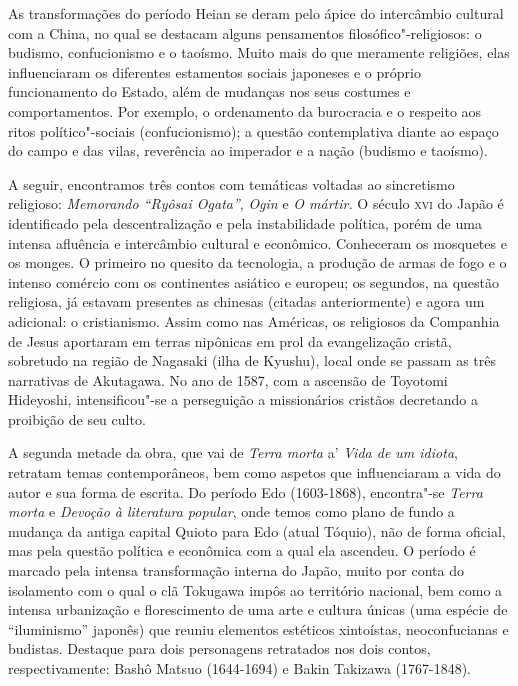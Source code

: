 \documentclass[12pt]{extarticle}
\begin{document}
As transformações do período Heian se deram pelo ápice do intercâmbio
cultural com a China, no qual se destacam alguns pensamentos
filosófico"-religiosos: o budismo, confucionismo e o taoísmo. Muito mais
do que meramente religiões, elas influenciaram os diferentes estamentos
sociais japoneses e o próprio funcionamento do Estado, além de mudanças
nos seus costumes e comportamentos. Por exemplo, o ordenamento da
burocracia e o respeito aos ritos político"-sociais (confucionismo); a
questão contemplativa diante ao espaço do campo e das vilas, reverência
ao imperador e a nação (budismo e taoísmo).

A seguir, encontramos três contos com temáticas voltadas ao sincretismo
religioso: \emph{Memorando ``Ryôsai Ogata''}, \emph{Ogin} e \emph{O
mártir.} O século \textsc{xvi} do Japão é identificado pela descentralização e
pela instabilidade política, porém de uma intensa afluência e
intercâmbio cultural e econômico. Conheceram os mosquetes e os monges. O
primeiro no quesito da tecnologia, a produção de armas de fogo e o
intenso comércio com os continentes asiático e europeu; os segundos, na
questão religiosa, já estavam presentes as chinesas (citadas
anteriormente) e agora um adicional: o cristianismo. Assim como nas
Américas, os religiosos da Companhia de Jesus aportaram em terras
nipônicas em prol da evangelização cristã, sobretudo na região de
Nagasaki (ilha de Kyushu), local onde se passam as três narrativas de
Akutagawa. No ano de 1587, com a ascensão de Toyotomi Hideyoshi,
intensificou"-se a perseguição a missionários cristãos decretando a
proibição de seu culto.

A segunda metade da obra, que vai de \emph{Terra morta} a' \emph{Vida de
um idiota}, retratam temas contemporâneos, bem como aspetos que
influenciaram a vida do autor e sua forma de escrita. Do período Edo
(1603-1868), encontra"-se \emph{Terra morta} e \emph{Devoção à literatura
popular}, onde temos como plano de fundo a mudança da antiga capital
Quioto para Edo (atual Tóquio), não de forma oficial, mas pela questão
política e econômica com a qual ela ascendeu. O período é marcado pela
intensa transformação interna do Japão, muito por conta do isolamento
com o qual o clã Tokugawa impôs ao território nacional, bem como a
intensa urbanização e florescimento de uma arte e cultura únicas (uma
espécie de ``iluminismo'' japonês) que reuniu elementos estéticos
xintoístas, neoconfucianas e budistas. Destaque para dois personagens
retratados nos dois contos, respectivamente: Bashô Matsuo (1644-1694) e
Bakin Takizawa (1767-1848).
\end{document}
